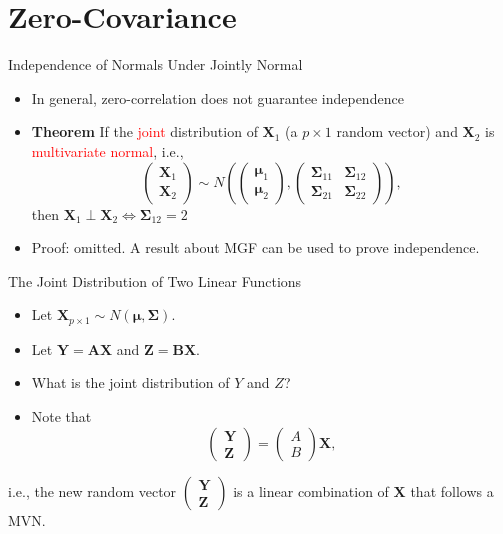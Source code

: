 \documentclass[
  ignorenonframetext,
]{beamer}
\providecommand{\tightlist}{%
  \setlength{\itemsep}{0pt}\setlength{\parskip}{0pt}}
\begin{document}
\hypertarget{zero-covariance}{%
\section{Zero-Covariance}\label{zero-covariance}}

\begin{frame}{Independence of Normals Under Jointly Normal}
\protect\hypertarget{independence-of-normals-under-jointly-normal}{}
\begin{itemize}
\item
  In general, zero-correlation does not guarantee independence
\item
  \textbf{Theorem} If the \textcolor{red}{joint} distribution of
  \(\mathbf X_1\) (a \(p\times 1\) random vector) and \(\mathbf X_2\) is
  \textcolor{red}{multivariate normal}, i.e., \[
  \begin{pmatrix}\mathbf X_1 \\ \mathbf X_2
  \end{pmatrix} \sim N(
  \begin{pmatrix}\boldsymbol \mu_1\\\boldsymbol \mu_2\end{pmatrix},
  \begin{pmatrix}\boldsymbol \Sigma_{11} & \boldsymbol \Sigma_{12}\\ \boldsymbol \Sigma_{21} & \boldsymbol \Sigma_{22}\end{pmatrix}),
  \] then
  \(\mathbf X_1 \perp \mathbf X_2 \Leftrightarrow \boldsymbol \Sigma_{12}=2\)
\item
  Proof: omitted. A result about MGF can be used to prove independence.
\end{itemize}
\end{frame}

\begin{frame}{The Joint Distribution of Two Linear Functions}
\protect\hypertarget{the-joint-distribution-of-two-linear-functions}{}
\begin{itemize}
\tightlist
\item
  Let
  \(\mathbf{X}_{p\times 1}\sim N(\boldsymbol \mu, \boldsymbol \Sigma)\).
\item
  Let \(\mathbf Y=\mathbf A \mathbf X\) and
  \(\mathbf Z=\mathbf B \mathbf X\).
\item
  What is the joint distribution of \(Y\) and \(Z\)?
\item
  Note that \[\begin{pmatrix}
  \mathbf Y\\ \mathbf Z
  \end{pmatrix}=\begin{pmatrix}A \\ B\end{pmatrix}\mathbf X,
  \]
\end{itemize}

i.e., the new random vector
\(\begin{pmatrix}\mathbf Y\\ \mathbf Z\end{pmatrix}\) is a linear
combination of \(\mathbf X\) that follows a MVN.
\end{frame}
\end{document}
